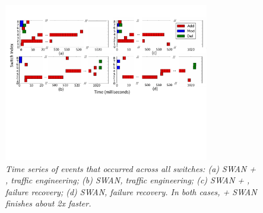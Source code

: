 \begin{figure}
        \begin{minipage}[b]{1.2in}
        \caption{\label{fig:bw}\em Time series of events that occurred across all switches: (a) SWAN + \name, traffic engineering; (b) SWAN, traffic engineering; (c) SWAN + \name, failure recovery; (d) SWAN, failure recovery. In both cases, \name + SWAN finishes about 2x faster.}
        \end{minipage}
        \hfill
        \begin{minipage}[b]{6in}
        \includegraphics[width=0.8\textwidth]{figs/bandwidth}
        \end{minipage}
\end{figure}
